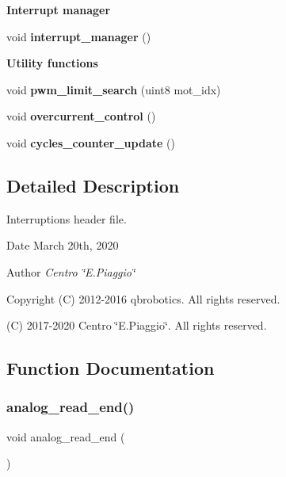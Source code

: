 \begin{Indent}\textbf{ Interrupt manager}\par
\begin{DoxyCompactItemize}
\item 
void \textbf{ interrupt\+\_\+manager} ()
\end{DoxyCompactItemize}
\end{Indent}
\begin{Indent}\textbf{ Utility functions}\par
\begin{DoxyCompactItemize}
\item 
void \textbf{ pwm\+\_\+limit\+\_\+search} (uint8 mot\+\_\+idx)
\item 
void \textbf{ overcurrent\+\_\+control} ()
\item 
void \textbf{ cycles\+\_\+counter\+\_\+update} ()
\end{DoxyCompactItemize}
\end{Indent}


\subsection{Detailed Description}
Interruptions header file. 

\begin{DoxyDate}{Date}
March 20th, 2020 
\end{DoxyDate}
\begin{DoxyAuthor}{Author}
{\itshape Centro \char`\"{}\+E.\+Piaggio\char`\"{}} 
\end{DoxyAuthor}
\begin{DoxyCopyright}{Copyright}
(C) 2012-\/2016 qbrobotics. All rights reserved. 

(C) 2017-\/2020 Centro \char`\"{}\+E.\+Piaggio\char`\"{}. All rights reserved. 
\end{DoxyCopyright}


\subsection{Function Documentation}
\mbox{\label{interruptions_8h_a00a8d34962a63161405e5d7785b9625e}} 
\subsubsection{analog\+\_\+read\+\_\+end()}
{\footnotesize\ttfamily void analog\+\_\+read\+\_\+end (\begin{DoxyParamCaption}{ }\end{DoxyParamCaption})}

